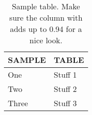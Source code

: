 \begin{table}[!ht]
\centering
\caption{Sample table. Make sure the column with adds up to 0.94 for a nice look.}
~\\
\label{tab:sample-table-label}
\begin{tabular}{p{} p{}}
\toprule
\textbf{SAMPLE}		  & \textbf{TABLE}                                                                                                                                                  \\ \toprule
One                   & Stuff 1 \\
\midrule
Two                   & Stuff 2 \\
\midrule
Three                 & Stuff 3\\
\bottomrule
\end{tabular}
\end{table}

